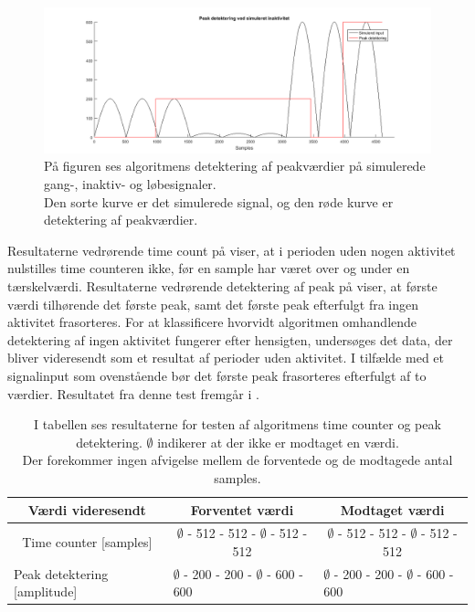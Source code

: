 \begin{figure}[H]
	\centering
	\includegraphics[width=.9\textwidth]{figures/cDesign/test_peak_inaktiv.png}
	\caption{På figuren ses algoritmens detektering af peakværdier på simulerede gang-, inaktiv- og løbesignaler. \\ Den sorte kurve er det simulerede signal, og den røde kurve er detektering af peakværdier.}
	\label{fig:test_inaktiv_peak}
\end{figure}
Resultaterne vedrørende time count på  viser, at i perioden uden nogen aktivitet nulstilles time counteren ikke, før en sample har været over og under en tærskelværdi. Resultaterne vedrørende detektering af peak på  viser, at første værdi tilhørende det første peak, samt det første peak efterfulgt fra ingen aktivitet frasorteres. For at klassificere hvorvidt algoritmen omhandlende detektering af ingen aktivitet fungerer efter hensigten, undersøges det data, der bliver videresendt som et resultat af perioder uden aktivitet. I tilfælde med et signalinput som ovenstående bør det første peak frasorteres efterfulgt af to værdier. Resultatet fra denne test fremgår i . %
\begin{table}[H]
	\centering
	\begin{tabular}{ccc}
		\hline
		\rowcolor[HTML]{C0C0C0} 
		Værdi videresendt & Forventet værdi & Modtaget værdi \\ \hline
		Time counter [samples] & $\emptyset$ - 512 - 512 - $\emptyset$ - 512 - 512 & $\emptyset$ - 512 - 512 - $\emptyset$ - 512 - 512 \\ \hline
		\multicolumn{1}{l}{Peak detektering [amplitude]} &     \multicolumn{1}{l}{$\emptyset$ - 200 - 200 - $\emptyset$ - 600 - 600}     &     \multicolumn{1}{l}{$\emptyset$ - 200 - 200 - $\emptyset$ - 600 - 600} \\ \hline
	\end{tabular}
	\caption{I tabellen ses resultaterne for testen af algoritmens time counter og peak detektering. $\emptyset$ indikerer at der ikke er modtaget en værdi. \\ Der forekommer ingen afvigelse mellem de forventede og de modtagede antal samples.}
	\label{tab:test_inaktiv}
\end{table}\vspace{-0.5cm}
